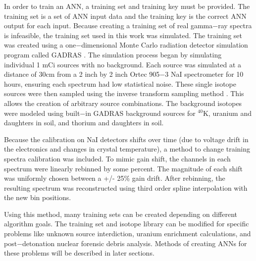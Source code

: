 \documentclass[tocnosub,noragright,centerchapter,12pt,fullpage]{uiucecethesis09}
\begin{document}
In order to train an ANN, a training set and training key must be provided. The training set is a set of ANN input data and the training key is the correct ANN output for each input. Because creating a training set of real gamma$-$ray spectra is infeasible, the training set used in this work was simulated. The training set was created using a one$-$dimensional Monte Carlo radiation detector simulation program called GADRAS \cite{mitchell2014}. The simulation process began by simulating individual 1 mCi sources with no background. Each source was simulated at a distance of 30cm from a 2 inch by 2 inch Ortec 905$-$3 NaI spectrometer for 10 hours, ensuring each spectrum had low statistical noise. These single isotope sources were then sampled using the inverse transform sampling method \cite{Devroyne}. This allows the creation of arbitrary source combinations. The background isotopes were modeled using built$-$in GADRAS background sources for $^{40}$K, uranium and daughters in soil, and thorium and daughters in soil.

Because the calibration on NaI detectors shifts over time (due to voltage drift in the electronics and changes in crystal temperature), a method to change training spectra calibration was included. To mimic gain shift, the channels in each spectrum were linearly rebinned by some percent. The magnitude of each shift was uniformly chosen between a +/- 25\% gain drift. After rebinning, the resulting spectrum was reconstructed using third order spline interpolation with the new bin positions.


Using this method, many training sets can be created depending on different algorithm goals. The training set and isotope library can be modified for specific problems like unknown source interdiction, uranium enrichment calculations, and post$-$detonation nuclear forensic debris analysis. Methods of creating ANNs for these problems will be described in later sections.

\end{document}
